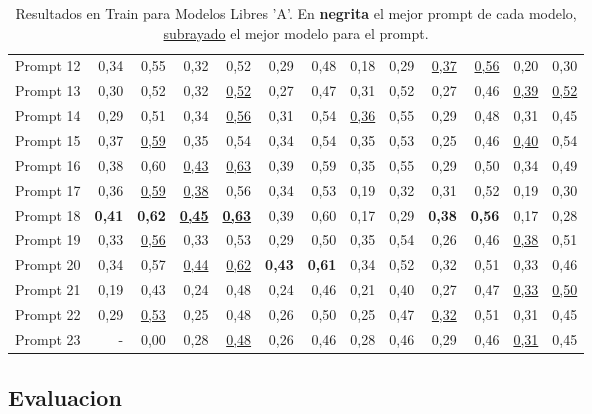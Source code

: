 \begin{table}[H]
{\begin{minipage}{\textheight}
{\begin{tabular}{l|rrrrrrrrrrrr}
Prompt 12 & 0,34 & 0,55 & 0,32 & 0,52 & 0,29 & 0,48 & 0,18 & 0,29 & \uline{0,37} & \uline{0,56} & 0,20 & 0,30 \\
Prompt 13 & 0,30 & 0,52 & 0,32 & \uline{0,52} & 0,27 & 0,47 & 0,31 & 0,52 & 0,27 & 0,46 & \uline{0,39} & \uline{0,52} \\
Prompt 14 & 0,29 & 0,51 & 0,34 & \uline{0,56} & 0,31 & 0,54 & \uline{0,36} & 0,55 & 0,29 & 0,48 & 0,31 & 0,45 \\
Prompt 15 & 0,37 & \uline{0,59} & 0,35 & 0,54 & 0,34 & 0,54 & 0,35 & 0,53 & 0,25 & 0,46 & \uline{0,40} & 0,54 \\
Prompt 16 & 0,38 & 0,60 & \uline{0,43} & \uline{0,63} & 0,39 & 0,59 & 0,35 & 0,55 & 0,29 & 0,50 & 0,34 & 0,49 \\
Prompt 17 & 0,36 & \uline{0,59} & \uline{0,38} & 0,56 & 0,34 & 0,53 & 0,19 & 0,32 & 0,31 & 0,52 & 0,19 & 0,30 \\
Prompt 18 & \textbf{0,41} & \textbf{0,62} & \uline{\textbf{0,45}} & \uline{\textbf{0,63}} & 0,39 & 0,60 & 0,17 & 0,29 & \textbf{0,38} & \textbf{0,56} & 0,17 & 0,28 \\
Prompt 19 & 0,33 & \uline{0,56} & 0,33 & 0,53 & 0,29 & 0,50 & 0,35 & 0,54 & 0,26 & 0,46 & \uline{0,38} & 0,51 \\
Prompt 20 & 0,34 & 0,57 & \uline{0,44} & \uline{0,62} & \textbf{0,43} & \textbf{0,61} & 0,34 & 0,52 & 0,32 & 0,51 & 0,33 & 0,46 \\
Prompt 21 & 0,19 & 0,43 & 0,24 & 0,48 & 0,24 & 0,46 & 0,21 & 0,40 & 0,27 & 0,47 & \uline{0,33} & \uline{0,50} \\
Prompt 22 & 0,29 & \uline{0,53} & 0,25 & 0,48 & 0,26 & 0,50 & 0,25 & 0,47 & \uline{0,32} & 0,51 & 0,31 & 0,45 \\
Prompt 23 & - & 0,00 & 0,28 & \uline{0,48} & 0,26 & 0,46 & 0,28 & 0,46 & 0,29 & 0,46 & \uline{0,31} & 0,45 \\
\hline
\end{tabular}
}%
\caption{Resultados en Train para Modelos Libres 'A'. En \textbf{negrita} el mejor prompt de cada modelo, \uline{subrayado} el mejor modelo para el prompt.}
\label{tab:resultados_5}
\end{minipage}%
}
\end{table}



\subsection{Evaluacion}\label{sec:tab_res_eval}

